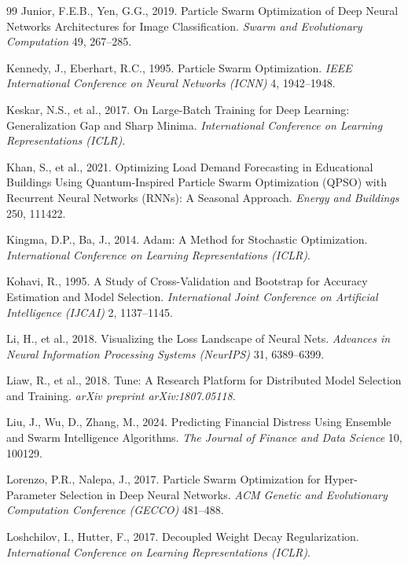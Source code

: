 \begin{thebibliography}{99}
Junior, F.E.B., Yen, G.G., 2019. Particle Swarm Optimization of Deep Neural Networks Architectures for Image Classification. \textit{Swarm and Evolutionary Computation} 49, 267–285.

Kennedy, J., Eberhart, R.C., 1995. Particle Swarm Optimization. \textit{IEEE International Conference on Neural Networks (ICNN)} 4, 1942–1948.

Keskar, N.S., et al., 2017. On Large-Batch Training for Deep Learning: Generalization Gap and Sharp Minima. \textit{International Conference on Learning Representations (ICLR)}.

Khan, S., et al., 2021. Optimizing Load Demand Forecasting in Educational Buildings Using Quantum-Inspired Particle Swarm Optimization (QPSO) with Recurrent Neural Networks (RNNs): A Seasonal Approach. \textit{Energy and Buildings} 250, 111422.

Kingma, D.P., Ba, J., 2014. Adam: A Method for Stochastic Optimization. \textit{International Conference on Learning Representations (ICLR)}.

Kohavi, R., 1995. A Study of Cross-Validation and Bootstrap for Accuracy Estimation and Model Selection. \textit{International Joint Conference on Artificial Intelligence (IJCAI)} 2, 1137–1145.

Li, H., et al., 2018. Visualizing the Loss Landscape of Neural Nets. \textit{Advances in Neural Information Processing Systems (NeurIPS)} 31, 6389–6399.

Liaw, R., et al., 2018. Tune: A Research Platform for Distributed Model Selection and Training. \textit{arXiv preprint arXiv:1807.05118}.

Liu, J., Wu, D., Zhang, M., 2024. Predicting Financial Distress Using Ensemble and Swarm Intelligence Algorithms. \textit{The Journal of Finance and Data Science} 10, 100129.

Lorenzo, P.R., Nalepa, J., 2017. Particle Swarm Optimization for Hyper-Parameter Selection in Deep Neural Networks. \textit{ACM Genetic and Evolutionary Computation Conference (GECCO)} 481–488.

Loshchilov, I., Hutter, F., 2017. Decoupled Weight Decay Regularization. \textit{International Conference on Learning Representations (ICLR)}.


\end{thebibliography}
